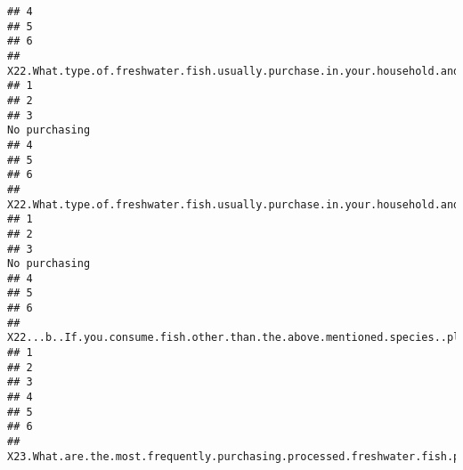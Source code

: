 \documentclass[
]{article}
\begin{document}
\begin{verbatim}
## 4                                                                                                          
## 5                                                                                                          
## 6                                                                                                          
##   X22.What.type.of.freshwater.fish.usually.purchase.in.your.household.and.how.much.per.month...Carp.Spp..
## 1                                                                                                        
## 2                                                                                                        
## 3                                                                                           No purchasing
## 4                                                                                                        
## 5                                                                                                        
## 6                                                                                                        
##   X22.What.type.of.freshwater.fish.usually.purchase.in.your.household.and.how.much.per.month...Other.
## 1                                                                                                    
## 2                                                                                                    
## 3                                                                                       No purchasing
## 4                                                                                                    
## 5                                                                                                    
## 6                                                                                                    
##   X22...b..If.you.consume.fish.other.than.the.above.mentioned.species..please.mention.it.here.
## 1                                                                                             
## 2                                                                                             
## 3                                                                                             
## 4                                                                                             
## 5                                                                                             
## 6                                                                                             
##   X23.What.are.the.most.frequently.purchasing.processed.freshwater.fish.products.in.your.household.per.month...Dried.fish.

\end{verbatim}
\end{document}
